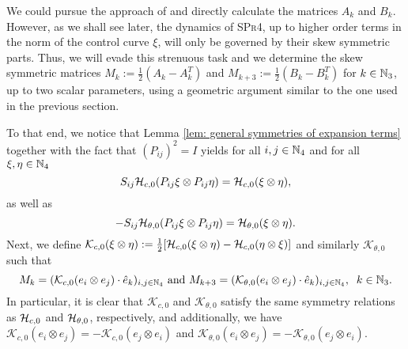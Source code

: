 We could pursue the approach of \cite{Alouges2017} and directly calculate the matrices $A_k$ and $B_k$. However, as we shall see later, the dynamics of \textsc{SPr4}, up to higher order terms in the norm of the control curve $\xi$, will only be governed by their skew symmetric parts. Thus, we will evade this strenuous task and we determine the skew symmetric matrices $M_k := \tfrac{1}{2}(A_k - A_k^T)$ and $M_{k + 3}:= \tfrac{1}{2}(B_k - B_k^T)$ for $k \in \mathbb{N}_3$, up to two scalar parameters, using a geometric argument similar to the one used in the previous section.


To that end, we notice that Lemma \ref{lem: general symmetries of expansion terms} together with the fact that $(P_{ij})^2 = I$ yields for all $i,j \in \mathbb{N}_4$ and for all $\xi, \eta \in \mathbb{N}_4$
\begin{equation}
	S_{ij} \mathcal{H}_{c,0}(P_{ij} \xi \otimes P_{ij} \eta) = \mathcal{H}_{c,0}(\xi \otimes \eta),
\end{equation}
as well as
\begin{equation}
	-S_{ij} \mathcal{H}_{\theta,0}(P_{ij} \xi \otimes P_{ij} \eta) = \mathcal{H}_{\theta, 0}(\xi \otimes \eta).
\end{equation}
Next, we define $\mathcal{K}_{c,0}(\xi \otimes \eta) := \tfrac{1}{2}[\mathcal{H}_{c,0}(\xi \otimes \eta) - \mathcal{H}_{c,0}(\eta \otimes \xi)]$ and similarly $\mathcal{K}_{\theta,0}$ such that
\begin{equation}
	M_k = (\mathcal{K}_{c,0}(e_i \otimes e_j) \cdot \hat{e}_k)_{i,j \in \mathbb{N}_4} \text{ and } M_{k + 3} = (\mathcal{K}_{\theta,0}(e_i \otimes e_j) \cdot \hat{e}_k)_{i,j \in \mathbb{N}_4},\;\; k \in \mathbb{N}_3.
\end{equation} 
In particular, it is clear that $\mathcal{K}_{c,0}$ and $\mathcal{K}_{\theta,0}$ satisfy the same symmetry relations as $\mathcal{H}_{c,0}$ and $\mathcal{H}_{\theta, 0}$, respectively, and additionally, we have $\mathcal{K}_{c,0}(e_i \otimes e_j) = - \mathcal{K}_{c,0}(e_j \otimes e_i)$ and $\mathcal{K}_{\theta,0}(e_i \otimes e_j) = - \mathcal{K}_{\theta,0}(e_j \otimes e_i)$.

